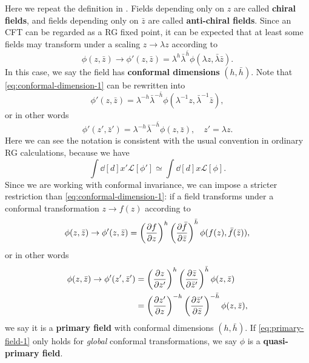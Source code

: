 \documentclass[hyperref, a4paper]{article}
\newcommand*{\concept}[1]{{\textbf{#1}}}
\begin{document}
Here we repeat the definition in \cite{blumenhagen2009introduction}. 
Fields depending only on $z$ are called \concept{chiral fields}, and fields depending only on $\bar{z}$ are 
called \concept{anti-chiral fields}. Since an CFT can be regarded as a RG fixed point, it can be expected that 
at least some fields may transform under a scaling $z \to \lambda z$ according to 
\begin{equation}
    \phi(z, \bar{z}) \to \phi'(z, \bar{z}) = \lambda^h \bar{\lambda}^{\bar{h}} \phi(\lambda z, \bar{\lambda} \bar{z}).
    \label{eq:conformal-dimension-1}
\end{equation}
In this case, we say the field has \concept{conformal dimensions} $(h, \bar{h})$. Note that \eqref{eq:conformal-dimension-1} can be rewritten into 
\[
    \phi'(z, \bar{z}) = \lambda^{-h} \bar{\lambda}^{-\bar{h}} \phi(\lambda^{-1} z, \bar{\lambda}^{-1} \bar{z}),
\]
or in other words
\begin{equation}
    \phi'(z', \bar{z}') = \lambda^{-h} \bar{\lambda}^{- \bar{h}} \phi(z, \bar{z}) , \quad z' = \lambda z.
\end{equation}
Here we can see the notation is consistent with the usual convention in ordinary RG calculations, because we have 
\[
    \int \dd[d]{x'} \mathcal{L}[\phi'] \simeq \int \dd[d]{x} \mathcal{L}[\phi].
\]
Since we are working with conformal invariance, we can impose a stricter restriction than 
\eqref{eq:conformal-dimension-1}: if a field transforms under a conformal transformation $z \to f(z)$
according to 
\begin{equation}
    \phi(z, \bar{z}) \to \phi'(z, \bar{z}) = \left(\pdv{f}{z}\right)^{h} \left(\pdv{\bar{f}}{\bar{z}}\right)^{\bar{h}} \phi(f(z), \bar{f}(\bar{z})),
    \label{eq:primary-field-1}
\end{equation}
or in other words 
\begin{equation}
    \begin{aligned}
        \phi(z, \bar{z}) \to \phi'(z', \bar{z}') &= \left(\pdv{z}{z'}\right)^{h} \left(\pdv{\bar{z}}{\bar{z}'}\right)^{\bar{h}} \phi(z, \bar{z}) \\
        &= \left(\pdv{z'}{z}\right)^{- h} \left(\pdv{\bar{z}'}{\bar{z}}\right)^{- \bar{h}} \phi(z, \bar{z}) ,
    \end{aligned}
\end{equation}
we say it is a \concept{primary field} with conformal dimensions $(h, \bar{h})$. If \eqref{eq:primary-field-1}
only holds for \emph{global} conformal transformations, we say $\phi$ is a \concept{quasi-primary field}.
\end{document}
